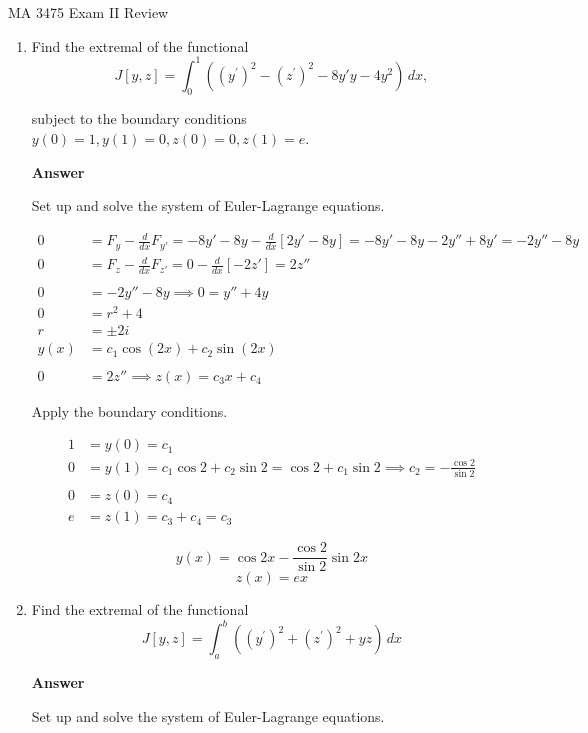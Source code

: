 \documentclass[12pt]{article}
\begin{document}
\noindent MA 3475\,\,Exam II Review 


\begin{enumerate}
\item Find the extremal of the functional
$$
J[y,z] = \int_0^1 \left((y^{\prime})^2 - (z^{\prime})^2 - 8y'y -4 y^2 \right)\,dx,
$$

subject to the boundary conditions $y(0) = 1, y(1)=  0, z(0) = 0, z(1) = e$.

{\bf Answer}

Set up and solve the system of Euler-Lagrange equations.

\begin{align*}
0 &= F_y - \frac{d}{dx}F_{y'} = -8y' -8y - \frac{d}{dx}[2y' - 8y] = -8y' - 8y - 2y'' + 8y' = -2y'' - 8y \\
0 &= F_z - \frac{d}{dx}F_{z'} = 0 - \frac{d}{dx}[-2z'] = 2z'' \\
& \\
0 &= -2y'' - 8y \implies 0 = y'' + 4y \\
0 &= r^2 + 4 \\
r &= \pm 2 i \\
y(x) &= c_1\cos(2x) + c_2 \sin(2x) \\
& \\
0 &= 2z'' \implies z(x) = c_3x + c_4
\end{align*}

Apply the boundary conditions.

\begin{align*}
1 &= y(0) = c_1 \\
0 &= y(1) = c_1\cos 2 + c_2 \sin 2 = \cos 2 + c_1 \sin 2 \implies c_2 = -\frac{\cos 2}{\sin 2} \\
& \\
0 &= z(0) = c_4 \\
e &= z(1) = c_3 + c_4 = c_3
\end{align*}

$$\boxed{y(x) = \cos 2x  -\frac{\cos 2}{\sin 2} \sin 2x} $$
$$\boxed{z(x) = ex }$$

\newpage

\item Find the extremal of the functional
$$
J[y,z] = \int_a^b \left((y^{\prime})^2 + (z^{\prime})^2 + y z \right)\,dx
$$

{\bf Answer}

Set up and solve the system of Euler-Lagrange equations.


\end{enumerate}
\end{document}
